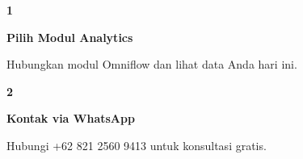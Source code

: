\documentclass[a4paper]{article}
\begin{document}
\begin{center}
\begin{minipage}[t]{0.318\textwidth}
    \colorbox{BlueBg}{%
        \begin{minipage}{\dimexpr\linewidth-2\fboxsep\relax}
            \vspace{6pt}
            \begin{center}
                {\fontsize{22}{26}\selectfont\bfseries\color{BluePrimary} 1}
            \end{center}
            \vspace{2pt}
            \begin{center}
                {\fontsize{10}{13}\selectfont\bfseries\color{BlueDark} Pilih Modul Analytics}\par\vspace{3pt}
                {\fontsize{9}{12}\selectfont\color{TextDark} Hubungkan modul Omniflow dan lihat data Anda hari ini.}
            \end{center}
            \vspace{6pt}
        \end{minipage}}
\end{minipage}%
\hfill
\begin{minipage}[t]{0.318\textwidth}
    \colorbox{BlueBg}{%
        \begin{minipage}{\dimexpr\linewidth-2\fboxsep\relax}
            \vspace{6pt}
            \begin{center}
                {\fontsize{22}{26}\selectfont\bfseries\color{BluePrimary} 2}
            \end{center}
            \vspace{2pt}
            \begin{center}
                {\fontsize{10}{13}\selectfont\bfseries\color{BlueDark} Kontak via WhatsApp}\par\vspace{3pt}
                {\fontsize{9}{12}\selectfont\color{TextDark} Hubungi +62 821 2560 9413 untuk konsultasi gratis.}
            \end{center}
            \vspace{6pt}
        \end{minipage}}
\end{minipage}%
\hfill
\begin{minipage}[t]{0.318\textwidth}
    \colorbox{BlueBg}{%
        \begin{minipage}{\dimexpr\linewidth-2\fboxsep\relax}
            \vspace{6pt}

\end{minipage}}
\end{minipage}
\end{center}
\end{document}
